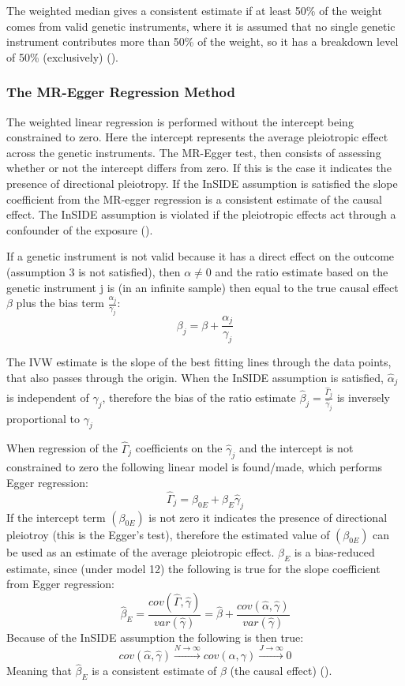 \documentclass[
]{article}
\begin{document}
The weighted median gives a consistent estimate if at least 50\% of the
weight comes from valid genetic instruments, where it is assumed that no
single genetic instrument contributes more than 50\% of the weight, so
it has a breakdown level of 50\% (exclusively)
().

\subsubsection{\texorpdfstring{\textbf{The MR-Egger Regression
Method}}{The MR-Egger Regression Method}}\label{the-mr-egger-regression-method}

The weighted linear regression is performed without the intercept being
constrained to zero. Here the intercept represents the average
pleiotropic effect across the genetic instruments. The MR-Egger test,
then consists of assessing whether or not the intercept differs from
zero. If this is the case it indicates the presence of directional
pleiotropy. If the InSIDE assumption is satisfied the slope coefficient
from the MR-egger regression is a consistent estimate of the causal
effect. The InSIDE assumption is violated if the pleiotropic effects act
through a confounder of the exposure ().

If a genetic instrument is not valid because it has a direct effect on
the outcome (assumption 3 is not satisfied), then \(\alpha\ne0\) and the
ratio estimate based on the genetic instrument j is (in an infinite
sample) then equal to the true causal effect \(\beta\) plus the bias
term \(\frac{\alpha_j}{\gamma_j}\):
\[\beta_j=\beta+\frac{\alpha_j}{\gamma_j}\tag{11}\]

The IVW estimate is the slope of the best fitting lines through the data
points, that also passes through the origin. When the InSIDE assumption
is satisfied, \(\hat\alpha_j\) is independent of \(\hat\gamma_j\),
therefore the bias of the ratio estimate
\(\hat\beta_j=\frac{\hat\Gamma_j}{\hat\gamma_j}\) is inversely
proportional to \(\gamma_j\)

When regression of the \(\hat\Gamma_j\) coefficients on the
\(\hat\gamma_j\) and the intercept is not constrained to zero the
following linear model is found/made, which performs Egger regression:
\[\hat\Gamma_j=\beta_{0E}+\beta_E\hat\gamma_j\tag{12}\] If the intercept
term \((\beta_{0E})\) is not zero it indicates the presence of
directional pleiotroy (this is the Egger's test), therefore the
estimated value of \((\beta_{0E})\) can be used as an estimate of the
average pleiotropic effect. \(\hat\beta_E\) is a bias-reduced estimate,
since (under model 12) the following is true for the slope coefficient
from Egger regression:
\[\hat\beta_E=\frac{cov(\hat\Gamma,\hat\gamma)}{var(\hat\gamma)}=\hat\beta+\frac{cov(\hat\alpha,\hat\gamma)}{var(\hat\gamma)}\tag{13}\]
Because of the InSIDE assumption the following is then true:
\[cov(\hat\alpha,\hat\gamma)\xrightarrow{N\to\infty}cov(\alpha,\gamma)\xrightarrow{J\to\infty}0\tag{14}\]
Meaning that \(\hat\beta_E\) is a consistent estimate of \(\beta\) (the
causal effect) ().
\end{document}
